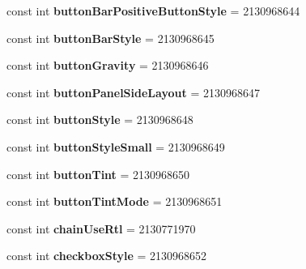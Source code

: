 \begin{DoxyCompactItemize}
const int {\bfseries button\+Bar\+Positive\+Button\+Style} = 2130968644
\item 
\mbox{\label{classst_delivery_1_1_resource_1_1_attribute_a98422993ad975380d6532df1bdee2d92}} 
const int {\bfseries button\+Bar\+Style} = 2130968645
\item 
\mbox{\label{classst_delivery_1_1_resource_1_1_attribute_ad1c3874af5f39fc8d6c4c60402645218}} 
const int {\bfseries button\+Gravity} = 2130968646
\item 
\mbox{\label{classst_delivery_1_1_resource_1_1_attribute_a39b3f573ed0456ce8b25903d20ad32b0}} 
const int {\bfseries button\+Panel\+Side\+Layout} = 2130968647
\item 
\mbox{\label{classst_delivery_1_1_resource_1_1_attribute_aa1cbe5fa924ff4abc45923ad729ae374}} 
const int {\bfseries button\+Style} = 2130968648
\item 
\mbox{\label{classst_delivery_1_1_resource_1_1_attribute_afef83e398769bd66d6b210477d354217}} 
const int {\bfseries button\+Style\+Small} = 2130968649
\item 
\mbox{\label{classst_delivery_1_1_resource_1_1_attribute_a724c0a42f391c22f82ea4e192fd646bd}} 
const int {\bfseries button\+Tint} = 2130968650
\item 
\mbox{\label{classst_delivery_1_1_resource_1_1_attribute_abd6adad79e111c1359ff3aa94bde8340}} 
const int {\bfseries button\+Tint\+Mode} = 2130968651
\item 
\mbox{\label{classst_delivery_1_1_resource_1_1_attribute_a1ec056ef4886640bde18ab37add550b4}} 
const int {\bfseries chain\+Use\+Rtl} = 2130771970
\item 
\mbox{\label{classst_delivery_1_1_resource_1_1_attribute_a51b4a418ceff3de684a4e6039f0cc9a8}} 
const int {\bfseries checkbox\+Style} = 2130968652

\end{DoxyCompactItemize}
